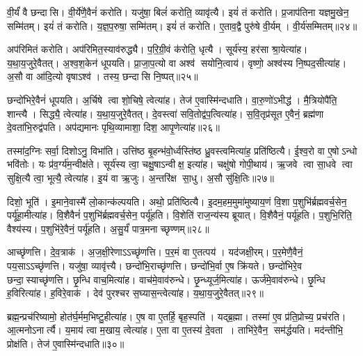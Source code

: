 वी॒र्यं॑ वै छन्दासि। 
वी॒र्ये॑णै॒वैनं॑ करोति। 
यजु॑षा॒ बिलं॑ करोति॒ व्यावृ॑त्यै। 
इयं॑ तं करोति। 
प्र॒जाप॑तिना यज्ञमु॒खेन॒ सम्मि॑तम्। 
इयं॑ तं करोति। 
य॒ज्ञ॒प॒रुषा॒ सम्मि॑तम्। 
इयं॑ तं करोति। 
ए॒ताव॒द्वै पुरु॑षे वी॒र्यम्। 
वी॒र्य॑सम्मितम्॥२४॥

अप॑रिमितं करोति। 
अप॑रिमित॒स्याव॑रुद्ध्यै। 
प॒रि॒ग्री॒वं क॑रोति॒ धृत्यै। 
सूर्य॑स्य॒ हर॑सा श्रा॒येत्या॑ह। 
य॒था॒य॒जुरे॒वैतत्। 
अ॒श्व॒श॒केन॑ धूपयति। 
प्रा॒जा॒प॒त्यो वा अश्व॑ सयोनि॒त्वाय॑। 
वृष्णो॒ अश्व॑स्य नि॒ष्पद॒सीत्या॑ह। 
अ॒सौ वा आ॑दि॒त्यो वृषाऽश्व॑। 
तस्य॒ छन्दासि नि॒ष्पत्॥२५॥

छन्दो॑भिरे॒वैनं॑ धूपयति। 
अ॒र्चिषे त्वा शो॒चिषे॒ त्वेत्या॑ह। 
तेज॑ ए॒वास्मि॑न्दधाति। 
वा॒रु॒णो॑ऽभीद्ध॑। 
मै॒त्रियोपै॑ति॒ शान्त्यै। 
सिद्ध्यै॒ त्वेत्या॑ह। 
य॒था॒य॒जुरे॒वैतत्। 
दे॒वस्त्वा॑ सवि॒तोद्व॑प॒त्वित्या॑ह। 
स॒वि॒तृप्र॑सूत ए॒वैनं॒ ब्रह्म॑णा दे॒वता॑भि॒रुद्व॑पति। 
अप॑द्यमानः पृथि॒व्यामाशा॒ दिश॒ आपृ॒णेत्या॑ह॥२६॥

तस्मा॑द॒ग्निः सर्वा॒ दिशोऽनु॒ विभा॑ति। 
उत्ति॑ष्ठ बृ॒हन्भ॑वो॒र्ध्वस्ति॑ष्ठ ध्रु॒वस्त्वमित्या॑ह॒ प्रति॑ष्ठित्यै। 
ई॒श्व॒रो वा ए॒षोऽन्धो भवि॑तोः। 
यः प्र॑व॒र्ग्य॑म॒न्वीक्ष॑ते। 
सूर्य॑स्य त्वा॒ चक्षु॒षाऽन्वीक्ष॒ इत्या॑ह। 
चक्षु॑षो गोपी॒थाय॑। 
ऋ॒जवे त्वा सा॒धवे त्वा सुक्षि॒त्यै त्वा॒ भूत्यै॒ त्वेत्या॑ह। 
इ॒यं वा ऋ॒जुः। 
अ॒न्तरि॑क्ष सा॒धु। 
अ॒सौ सु॑क्षि॒तिः॥२७॥

दिशो॒ भूति॑। 
इ॒माने॒वास्मै॑ लो॒कान्क॑ल्पयति। 
अथो॒ प्रति॑ष्ठित्यै। 
इ॒दम॒हम॒मुमा॑मुष्याय॒णं  वि॒शा प॒शुभि॑र्ब्रह्मवर्च॒सेन॒ पर्यू॑हा॒मीत्या॑ह। 
वि॒शैवैनं॑ प॒शुभि॑र्ब्रह्मवर्च॒सेन॒ पर्यू॑हति। 
वि॒शेति॑ राज॒न्य॑स्य ब्रूयात्। 
वि॒शैवैनं॒ पर्यू॑हति। 
प॒शुभि॒रिति॒ वैश्य॑स्य। 
प॒शुभि॑रे॒वैनं॒ पर्यू॑हति। 
अ॒सु॒र्यं॑ पात्र॒मनाच्छृण्णम्॥२८॥

आच्छृ॑णत्ति। 
दे॒व॒त्राक॑। 
अ॒ज॒क्षी॒रेणाऽऽच्छृ॑णत्ति। 
प॒र॒मं वा ए॒तत्पय॑। 
यद॑जक्षी॒रम्। 
प॒र॒मेणै॒वैनं॒ पय॒साऽऽच्छृ॑णत्ति। 
यजु॑षा॒ व्यावृ॑त्त्यै। 
छन्दो॑भि॒राच्छृ॑णत्ति। 
छन्दो॑भि॒र्वा ए॒ष क्रि॑यते। 
छन्दो॑भिरे॒व छन्दा॒स्याच्छृ॑णत्ति। 
छृ॒न्धि वाच॒मित्या॑ह। 
वाच॑मे॒वाव॑रुन्धे। 
छृ॒न्ध्यूर्ज॒मित्या॑ह। 
ऊर्ज॑मे॒वाव॑रुन्धे। 
छृ॒न्धि ह॒विरित्या॑ह। 
ह॒विरे॒वाक॑। 
देव॑ पुरश्चर स॒घ्यास॒न्त्वेत्या॑ह। 
य॒था॒य॒जुरे॒वैतत्॥२९॥
\anuvakamend[स्या॒द्यत् प्र॑व॒र्ग्य॑श्छन्दो॑भिः करोति वी॒र्य॑सम्मितं॒ छन्दासि नि॒ष्पत्पृ॒णेत्या॑ह सुक्षि॒तिरनाच्छृण्ण॒ञ्छन्दा॒स्या\-च्छृ॑णत्त्य॒ष्टौ च॑]

ब्रह्म॒न्प्रच॑रिष्यामो॒ होत॑र्घ॒र्मम॒भिष्टु॒हीत्या॑ह। 
ए॒ष वा ए॒तर्\mbox{}हि॒ बृह॒स्पति॑। 
यद्ब्र॒ह्मा। 
तस्मा॑ ए॒व प्र॑ति॒प्रोच्य॒ प्रच॑रति। 
आ॒त्मनोऽनार्त्यै। 
य॒माय॑ त्वा म॒खाय॒ त्वेत्या॑ह। 
ए॒ता वा ए॒तस्य॑ दे॒वता। 
ताभि॑रे॒वैन॒ सम॑र्द्धयति। 
मद॑न्तीभि॒ प्रोक्ष॑ति। 
तेज॑ ए॒वास्मि॑न्दधाति॥३०॥


